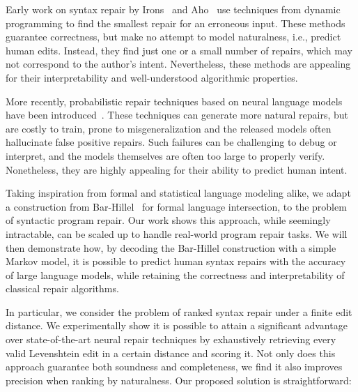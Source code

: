 \documentclass[sigplan,acmsmall,nonacm,screen]{acmart}\settopmatter{printfolios=false,printccs=false,printacmref=false}
\begin{document}
  Early work on syntax repair by Irons~\cite{irons1963error} and Aho~\cite{aho1972minimum} use techniques from dynamic programming to find the smallest repair for an erroneous input. These methods guarantee correctness, but make no attempt to model naturalness, i.e., predict human edits. Instead, they find just one or a small number of repairs, which may not correspond to the author's intent. Nevertheless, these methods are appealing for their interpretability and well-understood algorithmic properties.

  More recently, probabilistic repair techniques based on neural language models have been introduced~\cite{allamanis2021self, yasunaga2021break, sakkas2022seq2parse}. These techniques can generate more natural repairs, but are costly to train, prone to misgeneralization and the released models often hallucinate false positive repairs. Such failures can be challenging to debug or interpret, and the models themselves are often too large to properly verify. Nonetheless, they are highly appealing for their ability to predict human intent.

  Taking inspiration from formal and statistical language modeling alike, we adapt a construction from Bar-Hillel~\cite{bar1961formal} for formal language intersection, to the problem of syntactic program repair. Our work shows this approach, while seemingly intractable, can be scaled up to handle real-world program repair tasks. We will then demonstrate how, by decoding the Bar-Hillel construction with a simple Markov model, it is possible to predict human syntax repairs with the accuracy of large language models, while retaining the correctness and interpretability of classical repair algorithms.

  In particular, we consider the problem of ranked syntax repair under a finite edit distance. We experimentally show it is possible to attain a significant advantage over state-of-the-art neural repair techniques by exhaustively retrieving every valid Levenshtein edit in a certain distance and scoring it. Not only does this approach guarantee both soundness and completeness, we find it also improves precision when ranking by naturalness. Our proposed solution is straightforward:
\end{document}
